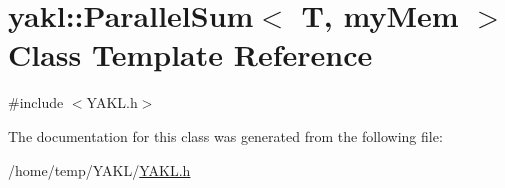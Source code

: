 \hypertarget{classyakl_1_1ParallelSum}{}\section{yakl\+:\+:Parallel\+Sum$<$ T, my\+Mem $>$ Class Template Reference}
\label{classyakl_1_1ParallelSum}


{\ttfamily \#include $<$Y\+A\+K\+L.\+h$>$}



The documentation for this class was generated from the following file\+:\begin{DoxyCompactItemize}
\item 
/home/temp/\+Y\+A\+K\+L/\hyperlink{YAKL_8h}{Y\+A\+K\+L.\+h}\end{DoxyCompactItemize}
